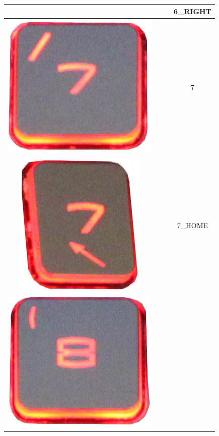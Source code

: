 \begin{longtable}{cccc}
\begin{minipage}[c]{.3\textwidth}
\vspace{0.2cm}
\end{minipage} & & & 6\_RIGHT\\
\hline
\begin{minipage}[c]{.3\textwidth}
\vspace{0.2cm}
\includegraphics[scale=0.1]{Images/KeyMapping/7}
\vspace{0.2cm}
\end{minipage} & & & 7\\
\hline
\begin{minipage}[c]{.3\textwidth}
\vspace{0.2cm}
\includegraphics[scale=0.1]{Images/KeyMapping/7_HOME}
\vspace{0.2cm}
\end{minipage} & & & 7\_HOME\\
\hline
\begin{minipage}[c]{.3\textwidth}
\vspace{0.2cm}
\includegraphics[scale=0.1]{Images/KeyMapping/8}

\end{minipage}
\end{longtable}
